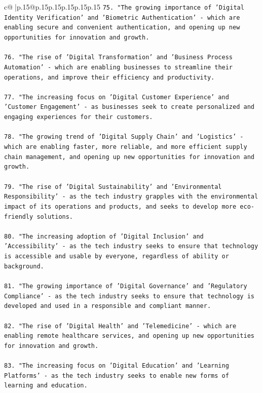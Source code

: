 \documentclass{article}
\begin{document}
{\begin{supertabular}{c@{$\;$}|p{.15\linewidth}@{}p{.15\linewidth}p{.15\linewidth}p{.15\linewidth}p{.15\linewidth}p{.15\linewidth}}
{{{\texttt{75. "The growing importance of 'Digital Identity Verification' and 'Biometric Authentication' {-} which are enabling secure and convenient authentication, and opening up new opportunities for innovation and growth.} \\
\\ 
\texttt{76. "The rise of 'Digital Transformation' and 'Business Process Automation' {-} which are enabling businesses to streamline their operations, and improve their efficiency and productivity.} \\
\\ 
\texttt{77. "The increasing focus on 'Digital Customer Experience' and 'Customer Engagement' {-} as businesses seek to create personalized and engaging experiences for their customers.} \\
\\ 
\texttt{78. "The growing trend of 'Digital Supply Chain' and 'Logistics' {-} which are enabling faster, more reliable, and more efficient supply chain management, and opening up new opportunities for innovation and growth.} \\
\\ 
\texttt{79. "The rise of 'Digital Sustainability' and 'Environmental Responsibility' {-} as the tech industry grapples with the environmental impact of its operations and products, and seeks to develop more eco{-}friendly solutions.} \\
\\ 
\texttt{80. "The increasing adoption of 'Digital Inclusion' and 'Accessibility' {-} as the tech industry seeks to ensure that technology is accessible and usable by everyone, regardless of ability or background.} \\
\\ 
\texttt{81. "The growing importance of 'Digital Governance' and 'Regulatory Compliance' {-} as the tech industry seeks to ensure that technology is developed and used in a responsible and compliant manner.} \\
\\ 
\texttt{82. "The rise of 'Digital Health' and 'Telemedicine' {-} which are enabling remote healthcare services, and opening up new opportunities for innovation and growth.} \\
\\ 
\texttt{83. "The increasing focus on 'Digital Education' and 'Learning Platforms' {-} as the tech industry seeks to enable new forms of learning and education.} \\
\\ 
}}}
\end{supertabular}}
\end{document}
